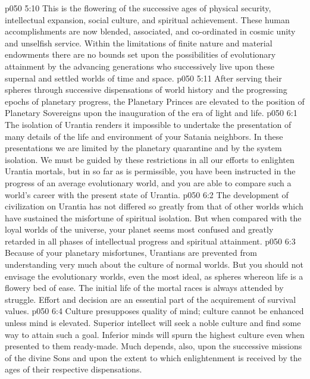 \vs p050 5:10 \pc {}\bibnobreakspace {} This is the flowering of the successive ages of physical security, intellectual expansion, social culture, and spiritual achievement. These human accomplishments are now blended, associated, and co\hyp{}ordinated in cosmic unity and unselfish service. Within the limitations of finite nature and material endowments there are no bounds set upon the possibilities of evolutionary attainment by the advancing generations who successively live upon these supernal and settled worlds of time and space.
\vs p050 5:11 \pc After serving their spheres through successive dispensations of world history and the progressing epochs of planetary progress, the Planetary Princes are elevated to the position of Planetary Sovereigns upon the inauguration of the era of light and life.
\vs p050 6:1 The isolation of Urantia renders it impossible to undertake the presentation of many details of the life and environment of your Satania neighbors. In these presentations we are limited by the planetary quarantine and by the system isolation. We must be guided by these restrictions in all our efforts to enlighten Urantia mortals, but in so far as is permissible, you have been instructed in the progress of an average evolutionary world, and you are able to compare such a world’s career with the present state of Urantia.
\vs p050 6:2 The development of civilization on Urantia has not differed so greatly from that of other worlds which have sustained the misfortune of spiritual isolation. But when compared with the loyal worlds of the universe, your planet seems most confused and greatly retarded in all phases of intellectual progress and spiritual attainment.
\vs p050 6:3 Because of your planetary misfortunes, Urantians are prevented from understanding very much about the culture of normal worlds. But you should not envisage the evolutionary worlds, even the most ideal, as spheres whereon life is a flowery bed of ease. The initial life of the mortal races is always attended by struggle. Effort and decision are an essential part of the acquirement of survival values.
\vs p050 6:4 Culture presupposes quality of mind; culture cannot be enhanced unless mind is elevated. Superior intellect will seek a noble culture and find some way to attain such a goal. Inferior minds will spurn the highest culture even when presented to them ready\hyp{}made. Much depends, also, upon the successive missions of the divine Sons and upon the extent to which enlightenment is received by the ages of their respective dispensations.
